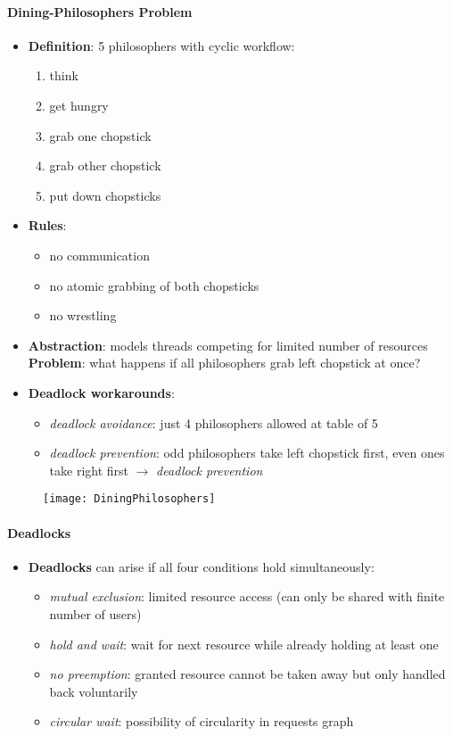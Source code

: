 \paragraph{Dining-Philosophers Problem}
\begin{itemize}
  \item \textbf{Definition}: 5 philosophers with cyclic workflow:
  \begin{enumerate}
    \item think
    \item get hungry
    \item grab one chopstick
    \item grab other chopstick
    \item put down chopsticks
  \end{enumerate}
  \item \textbf{Rules}:
  \begin{itemize}
    \item no communication
    \item no atomic grabbing of both chopsticks
    \item no wrestling
  \end{itemize}
  \item \textbf{Abstraction}: models threads competing for limited number of resources
  \textbf{Problem}: what happens if all philosophers grab left chopstick at once?
  \item \textbf{Deadlock workarounds}:
  \begin{itemize}
    \item \emph{deadlock avoidance}: just 4 philosophers allowed at table of 5
    \item \emph{deadlock prevention}: odd philosophers take left chopstick first, even ones take right first $ \to $ \emph{deadlock prevention}
  \end{itemize}
\end{itemize}
\begin{figure}[h]\centering\label{DiningPhilosophers}\texttt{[image: DiningPhilosophers]}\end{figure}

\paragraph{Deadlocks}
\begin{itemize}
  \item \textbf{Deadlocks} can arise if all four conditions hold simultaneously:
  \begin{itemize}
    \item \emph{mutual exclusion}: limited resource access (can only be shared with finite number of users)
    \item \emph{hold and wait}: wait for next resource while already holding at least one
    \item \emph{no preemption}: granted resource cannot be taken away but only handled back voluntarily
    \item \emph{circular wait}: possibility of circularity in requests graph
  \end{itemize}
\end{itemize}

